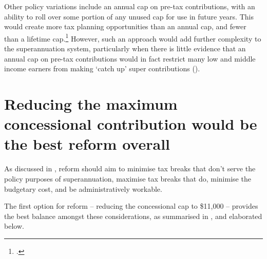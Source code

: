 Other policy variations include an annual cap on pre-tax contributions, with an ability to roll over some portion of any unused cap for use in future years. This would create more tax planning opportunities than an annual cap, and fewer than a lifetime cap.\footcite[][18]{Mercer2015SubmissionToReThink}  However, such an approach would add further complexity to the superannuation system, particularly when there is little evidence that an annual cap on pre-tax contributions would in fact restrict many low and middle income earners from making ‘catch up’ super contributions ().

\section{Reducing the maximum concessional contribution would be the best reform overall\label{sec:SUPER-4-6}}
As discussed in , reform should aim to minimise tax breaks that don’t serve the policy purposes of superannuation, maximise tax breaks that do, minimise the budgetary cost, and be administratively workable.


The first option for reform – reducing the concessional cap to \$11,000 – provides the best balance amongst these considerations, as summarised in , and elaborated below.

